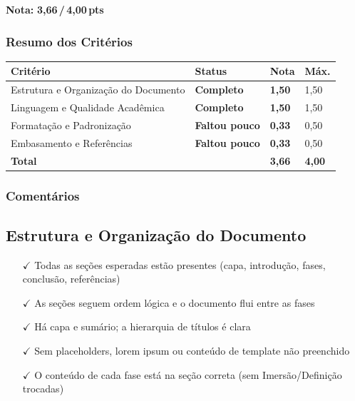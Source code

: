 \documentclass[
  sigconf,
  nonacm, %
  language=portuguese
]{acmart}
\newcommand{\notadestaque}[2]{%
  \noindent\textbf{Nota:}\enspace%
  {\large\bfseries\color{cred}#1\,/\,#2\,pts}%
}
\newcommand{\statusok}[1]{{\small\bfseries\color{cgood}#1}}
\newcommand{\statuswarn}[1]{{\small\bfseries\color{cwarn}#1}}
\begin{document}
\notadestaque{3,66}{4,00}

\subsubsection*{Resumo dos Critérios}

\begin{tabular}{@{} L{2.6cm} C{2.5cm} C{1.1cm} C{1.1cm} @{}}
\toprule
\textbf{Critério} & \textbf{Status} & \textbf{Nota} & \textbf{Máx.} \\
\midrule
Estrutura e Organização do Documento & \statusok{Completo} & \textbf{1,50} & 1,50 \\
Linguagem e Qualidade Acadêmica & \statusok{Completo} & \textbf{1,50} & 1,50 \\
Formatação e Padronização & \statuswarn{Faltou pouco} & \textbf{0,33} & 0,50 \\
Embasamento e Referências & \statuswarn{Faltou pouco} & \textbf{0,33} & 0,50 \\
\midrule
\textbf{Total} & & \textbf{\color{cred}3,66} & \textbf{4,00} \\
\bottomrule
\end{tabular}

\subsubsection*{Comentários}

\subsection{Estrutura e Organização do Documento}

\noindent\statusok{1,50\,/\,1,50 pts · Completo}

\begin{itemize}[leftmargin=14pt,itemsep=1pt,topsep=3pt,parsep=0pt]
  \item[\textcolor{cgood}{$\checkmark$}] {\small\textcolor{cgood}{Todas as seções esperadas estão presentes (capa, introdução, fases, conclusão, referências)}}
  \item[\textcolor{cgood}{$\checkmark$}] {\small\textcolor{cgood}{As seções seguem ordem lógica e o documento flui entre as fases}}
  \item[\textcolor{cgood}{$\checkmark$}] {\small\textcolor{cgood}{Há capa e sumário; a hierarquia de títulos é clara}}
  \item[\textcolor{cgood}{$\checkmark$}] {\small\textcolor{cgood}{Sem placeholders, lorem ipsum ou conteúdo de template não preenchido}}
  \item[\textcolor{cgood}{$\checkmark$}] {\small\textcolor{cgood}{O conteúdo de cada fase está na seção correta (sem Imersão/Definição trocadas)}}
\end{itemize}
\end{document}
